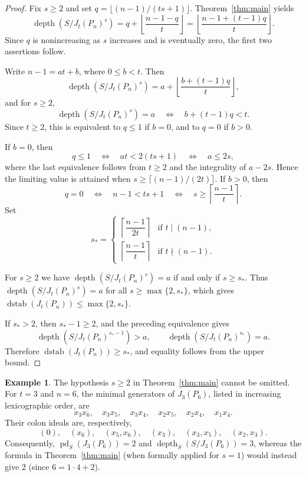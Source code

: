 \documentclass[12pt]{amsart}
\theoremstyle{definition}
\newtheorem{example}[theorem]{Example}
\theoremstyle{remark}
\numberwithin{equation}{section}
\DeclareMathOperator{\depth}{depth}
\begin{document}
\begin{proof}
Fix $s\ge2$ and set
$q=\lfloor(n-1)/(ts+1)\rfloor$.
Theorem~\ref{thm:main} yields
\[
\depth(S/J_t(P_n)^s)
=
q+\left\lfloor\frac{n-1-q}{t}\right\rfloor
=
\left\lfloor\frac{n-1+(t-1)q}{t}\right\rfloor.
\]
Since $q$ is nonincreasing as $s$ increases and is eventually zero,
the first two assertions follow.

Write $n-1=at+b$, where $0\le b<t$. Then
\[
\depth(S/J_t(P_n)^s)
=
a+\left\lfloor\frac{b+(t-1)q}{t}\right\rfloor,
\]
and for $s\ge 2$,
\begin{equation}\label{eq:attain}
\depth(S/J_t(P_n)^s)=a
\quad\Longleftrightarrow\quad
b+(t-1)q<t .
\end{equation}
Since $t\ge2$, this is equivalent to
$q\le1$ if $b=0$, and to $q=0$ if $b>0$.

If $b=0$, then
\[
q\le1
\quad\Longleftrightarrow\quad
at<2(ts+1)
\quad\Longleftrightarrow\quad
a\le2s,
\]
where the last equivalence follows from $t\ge2$ and the integrality
of $a-2s$. Hence the limiting value is attained when
$s\ge\lceil(n-1)/(2t)\rceil$.
If $b>0$, then
\[
q=0
\quad\Longleftrightarrow\quad
n-1<ts+1
\quad\Longleftrightarrow\quad
s\ge\left\lceil\frac{n-1}{t}\right\rceil.
\]
Set
\[
s_*=
\begin{cases}
\left\lceil\dfrac{n-1}{2t}\right\rceil & \text{if } t\mid (n-1),\\[6pt]
\left\lceil\dfrac{n-1}{t}\right\rceil & \text{if } t\nmid (n-1).
\end{cases}
\]

For $s\ge 2$ we have $\depth(S/J_t(P_n)^s)=a$ if and only if $s\ge s_*$.
Thus $\depth(S/J_t(P_n)^s)=a$ for all $s\ge \max\{2,s_*\}$, which gives
$\operatorname{dstab}(J_t(P_n))\le\max\{2,s_*\}$.

If $s_*>2$, then $s_*-1\ge2$, and the preceding
equivalence gives
\[
\depth(S/J_t(P_n)^{s_*-1})>a,
\qquad
\depth(S/J_t(P_n)^{s_*})=a.
\]
Therefore
$\operatorname{dstab}(J_t(P_n))\ge s_*$, and equality
follows from the upper bound.
\end{proof}

\begin{example}\label{ex:s1}
The hypothesis $s \ge 2$ in Theorem~\ref{thm:main} cannot be omitted. For $t = 3$ and $n = 6$, the minimal generators of $J_3(P_6)$, listed in increasing lexicographic order, are
\[
x_3x_6, \quad x_3x_5, \quad x_3x_4, \quad x_2x_5, \quad x_2x_4, \quad x_1x_4.
\]
Their colon ideals are, respectively,
\[
(0), \quad (x_6), \quad (x_5, x_6), \quad (x_3), \quad (x_3, x_5), \quad (x_2, x_3).
\]
Consequently, $\operatorname{pd}_S(J_3(P_6)) = 2$ and $\operatorname{depth}_S(S/J_3(P_6)) = 3$, whereas the formula in Theorem~\ref{thm:main} (when formally applied for $s=1$) would instead give $2$ (since $6 = 1 \cdot 4 + 2$).
\end{example}
\end{document}
